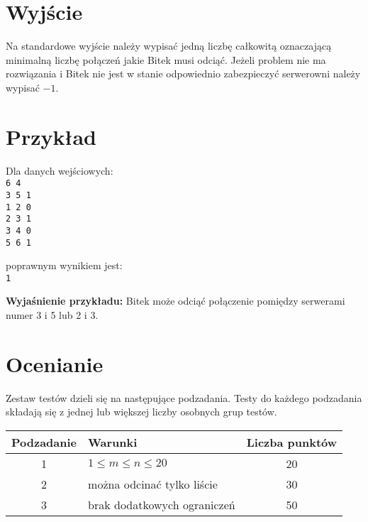 \documentclass[10pt]{article}
\begin{document}

    \section*{Wyjście}
    
    Na standardowe wyjście należy wypisać jedną liczbę całkowitą oznaczającą minimalną liczbę połączeń jakie Bitek musi odciąć. Jeżeli problem nie ma rozwiązania i Bitek nie jest w stanie odpowiednio zabezpieczyć serwerowni należy wypisać $-1$.


    \section*{Przykład}
    
    \noindent
    \begin{minipage}[t]{0.5\textwidth}
        Dla danych wejściowych:\vspace{1ex}\\
        \texttt{6 4\\3 5 1\\1 2 0\\2 3 1\\3 4 0\\5 6 1}
    \end{minipage}
    \begin{minipage}[t]{0.5\textwidth}
        poprawnym wynikiem jest:\vspace{1ex}\\
        \texttt{1}
    \end{minipage}
    
    \vspace{2ex}
    \noindent\textbf{Wyjaśnienie przykładu:} Bitek może odciąć połączenie pomiędzy serwerami numer 3 i 5 lub 2 i 3.
    

    \section*{Ocenianie}
        
    Zestaw testów dzieli się na następujące podzadania. Testy do każdego podzadania składają się z jednej lub większej liczby osobnych grup testów.
    
    \begin{center}
        \begin{tabular}{ |c|p{9cm}|c| }
            \hline
            \textbf{Podzadanie} & \textbf{Warunki} & \textbf{Liczba punktów}\\
            \hline
            1 & $1 \leq m \leq n \leq 20$ & 20\\
            \hline
            2 & można odcinać tylko liście\footnotemark & 30\\
            \hline
            3 & brak dodatkowych ograniczeń & 50\\
            \hline
        \end{tabular}
    \end{center}
\end{document}
